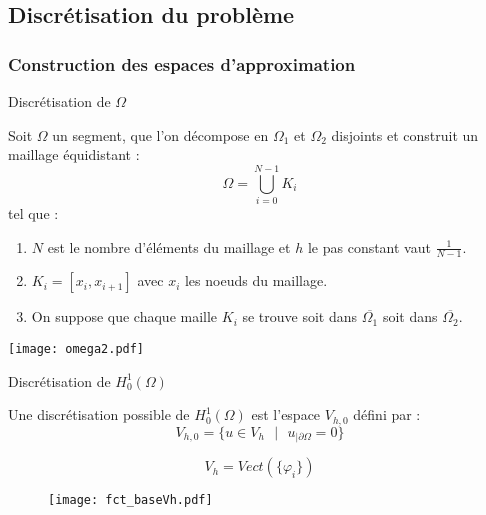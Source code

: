 \documentclass[10pt]{beamer}
\begin{document}
\subsection{Discrétisation du problème}



\subsubsection{Construction des espaces d’approximation }




\begin{frame}{Discrétisation de $\Omega$}

Soit $\Omega $ un segment, que l'on décompose en $\Omega_{1}$ et 
$\Omega_{2}$ disjoints et construit un maillage équidistant : $$ \Omega = 
\bigcup_{i =0} ^{N - 1} K_i $$ 
tel que :
\begin{enumerate}
 \item $N$ est le nombre d'éléments du maillage et $h$ le pas constant vaut $ \frac{1}{N- 1}$.
 \item $ K_i = [x_i, x_{i+1}] $ avec $x_i$ les noeuds du maillage.
 \item On suppose que chaque maille $K_i$ se trouve soit dans $\overline{\Omega_1}$ soit dans $\overline{\Omega_2}$.
\end{enumerate}

\begin{center}
\texttt{[image: omega2.pdf]}
\caption{Décomposition de $\Omega$ en $K_i$}
\end{center}
\end{frame}



\begin{frame}{Discrétisation de $H^{1}_{0}(\Omega)$}

\noindent Une discrétisation possible de $H^{1}_{0}(\Omega)$ est l’espace $V_{h,0}$ défini par : 
$$ 
V_{h,0} = \{u \in V_{h} \text{  }| \text{  } u_{| \partial \Omega} = 0 \} 
$$

$$ 
V_h  = Vect (\{\varphi_{i}\})  
$$

\begin{figure}
\texttt{[image: fct\_baseVh.pdf]}
\end{figure}

\end{frame}
\end{document}
